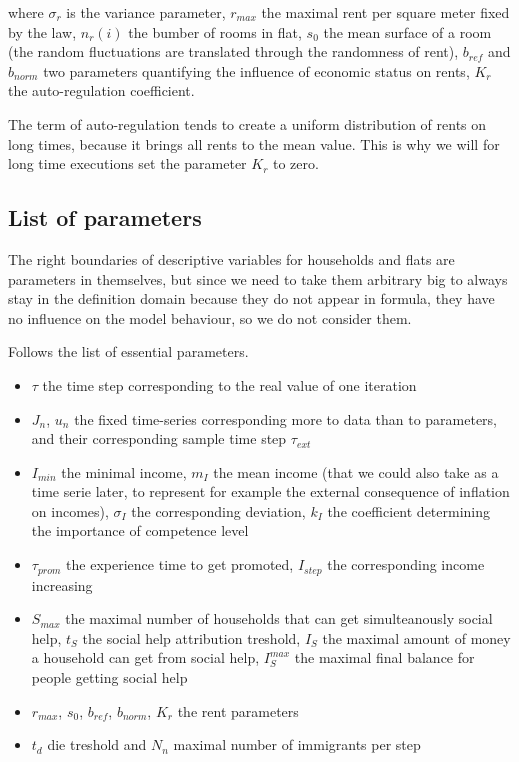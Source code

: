 \documentclass[english]{article}
\begin{document}
where $\sigma_{r}$ is the variance parameter, $r_{max}$ the maximal
rent per square meter fixed by the law, $n_{r}(i)$ the bumber of
rooms in flat, $s_{0}$ the mean surface of a room (the random fluctuations
are translated through the randomness of rent), $b_{ref}$ and $b_{norm}$
two parameters quantifying the influence of economic status on rents,
$K_{r}$ the auto-regulation coefficient.

The term of auto-regulation tends to create a uniform distribution
of rents on long times, because it brings all rents to the mean value.
This is why we will for long time executions set the parameter $K_{r}$ to
zero.


\subsection{List of parameters}

The right boundaries of descriptive variables for households and flats
are parameters in themselves, but since we need to take them arbitrary
big to always stay in the definition domain because they do not appear
in formula, they have no influence on the model behaviour, so we do not
consider them.

Follows the list of essential parameters.
\begin{itemize}
\item $\tau$ the time step corresponding to the real value of one iteration
\item $J_{n}$, $u_{n}$ the fixed time-series corresponding more to data
than to parameters, and their corresponding sample time step $\tau_{ext}$
\item $I_{min}$ the minimal income, $m_{I}$ the mean income (that we could
also take as a time serie later, to represent for example the external
consequence of inflation on incomes), $\sigma_{I}$ the corresponding
deviation, $k_{I}$ the coefficient determining the importance of
competence level
\item $\tau_{prom}$ the experience time to get promoted, $I_{step}$ the
corresponding income increasing
\item $S_{max}$ the maximal number of households that can get simulteanously
social help, $t_{S}$ the social help attribution treshold, $I_{S}$
the maximal amount of money a household can get from social help,
$I_{S}^{max}$ the maximal final balance for people getting social
help
\item $r_{max}$, $s_{0}$, $b_{ref}$, $b_{norm}$, $K_{r}$ the rent parameters
\item $t_{d}$ die treshold and $N_{n}$ maximal number of immigrants per
step
\end{itemize}
\end{document}
